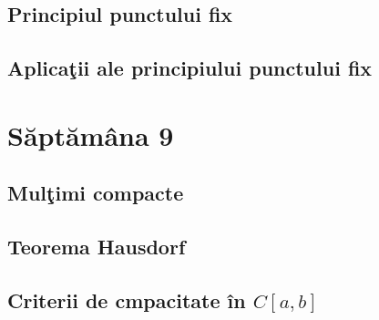 \documentclass[a4paper,12pt]{article}
\theoremstyle{change}
\begin{document}
\subsection{Principiul punctului fix}

\subsection{Aplicaţii ale principiului  punctului fix}

\section{Săptămâna 9}


\subsection{Mulţimi compacte}

\subsection{Teorema Hausdorf}


\subsection{Criterii de cmpacitate în $C[a,b]$}

\end{document}
